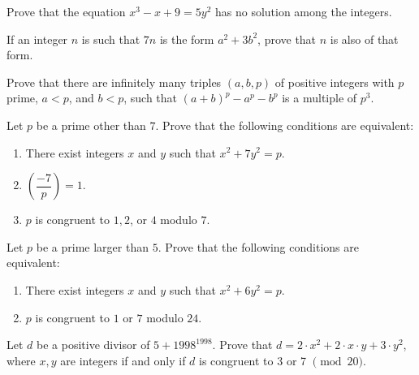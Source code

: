 \documentclass{subfile}
\begin{document}
	\begin{problem}[K\"{o}MaL] %
		Prove that the equation $x^3-x+9=5y^2$ has no solution among the integers.
	\end{problem}

	\begin{problem}[India 1998]
		If an integer $n$ is such that $7n$ is the form $a^2 + 3b^2$, prove that $n$ is also of that form.
	\end{problem}

	\begin{problem} %
		Prove that there are infinitely many triples $(a, b, p)$ of positive integers with $p$ prime, $a < p$, and $b < p$, such that $(a + b)^p - a^p - b^p$ is a multiple of $p^3$.
	\end{problem}

	\begin{problem}
		Let $p$ be a prime other than $7$. Prove that the following conditions are equivalent:
		\begin{enumerate}
			\item There exist integers $x$ and $y$ such that $x^2+7y^2=p$.
			\item $\left(\dfrac{-7}{p}\right) = 1$.
			\item $p$ is congruent to $1,2$, or $4$ modulo $7$.
		\end{enumerate}
	\end{problem}

	\begin{problem}
		Let $p$ be a prime larger than $5$. Prove that the following conditions are equivalent:
		\begin{enumerate}
			\item There exist integers $x$ and $y$ such that $x^2+6y^2=p$.
			\item $p$ is congruent to $1$ or $7$ modulo $24$.
		\end{enumerate}
	\end{problem}

	\begin{problem} %
		Let $d$ be a positive divisor of $5 + 1998^{1998}$. Prove that $d = 2 \cdot x^2 + 2 \cdot x \cdot y + 3 \cdot y^2$, where $x, y$ are integers if and only if $d$ is congruent to 3 or 7 $\pmod{20}$.
	\end{problem}
\end{document}
